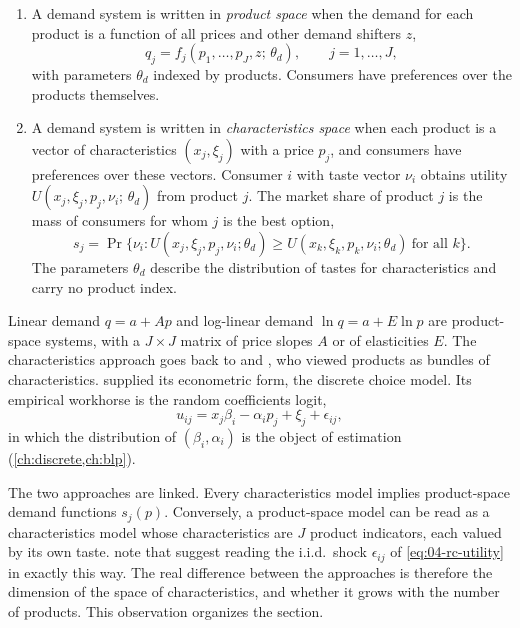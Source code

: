 \begin{definition}\label{def:04-spaces}
\leavevmode
\begin{enumerate}[label=(\roman*)]
  \item A demand system is written in \emph{product space} when the demand for each product is a function of all
  prices and other demand shifters $z$,
  \begin{equation}\label{eq:04-productspace}
  q_j = f_j(p_1, \dots, p_J, z;\, \theta_d), \qquad j = 1, \dots, J,
  \end{equation}
  with parameters $\theta_d$ indexed by products. Consumers have preferences over the products themselves.
  \item A demand system is written in \emph{characteristics space} when each product is a vector of
  characteristics $(x_j, \xi_j)$ with a price $p_j$, and consumers have preferences over these vectors. Consumer
  $i$ with taste vector $\nu_i$ obtains utility $U(x_j, \xi_j, p_j, \nu_i;\, \theta_d)$ from product $j$. The market
  share of product $j$ is the mass of consumers for whom $j$ is the best option,
  \begin{equation}\label{eq:04-charshare}
  s_j = \Pr\big\{\nu_i : U(x_j, \xi_j, p_j, \nu_i;\theta_d) \geq U(x_k, \xi_k, p_k, \nu_i;\theta_d)\ \text{for all } k\big\}.
  \end{equation}
  The parameters $\theta_d$ describe the distribution of tastes for characteristics and carry no product index.
\end{enumerate}
\end{definition}

Linear demand $q = a + Ap$ and log-linear demand $\ln q = a + E\ln p$ are product-space systems, with a $J \times J$
matrix of price slopes $A$ or of elasticities $E$. The characteristics approach goes back to \citet{Lancaster1966}
and \citet{Gorman1980}, who viewed products as bundles of characteristics. \citet{McFadden1974} supplied its
econometric form, the discrete choice model. Its empirical workhorse is the random coefficients logit,
\begin{equation}\label{eq:04-rc-utility}
u_{ij} = x_j\beta_i - \alpha_i p_j + \xi_j + \epsilon_{ij},
\end{equation}
in which the distribution of $(\beta_i, \alpha_i)$ is the object of estimation (\cref{ch:discrete,ch:blp}).

The two approaches are linked. Every characteristics model implies product-space demand functions $s_j(p)$.
Conversely, a product-space model can be read as a characteristics model whose characteristics are $J$ product
indicators, each valued by its own taste. \citet[p.~5]{BerryPakes2007} note that \citet{CaplinNalebuff1991}
suggest reading the i.i.d.\ shock $\epsilon_{ij}$ of \eqref{eq:04-rc-utility} in exactly this way. The real
difference between the approaches is therefore the dimension of the space of characteristics, and whether it grows
with the number of products. This observation organizes the section.

